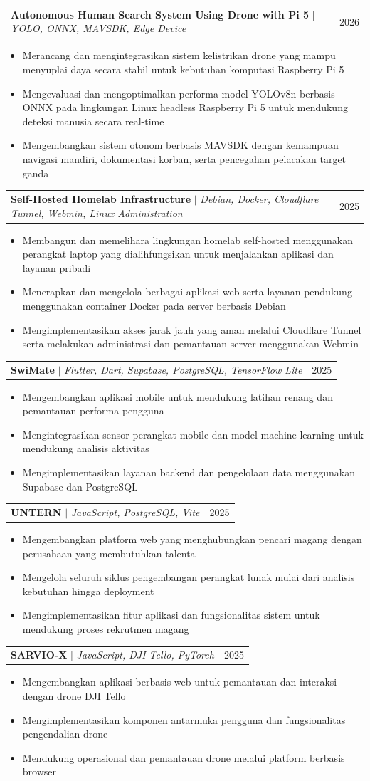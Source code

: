 \documentclass[letterpaper,11pt]{article}
\makeatletter
\newcommand{\resumeItem}[1]{
	\item\small{
		{#1 \vspace{-2pt}}
	}
}
\newcommand{\resumeProjectHeading}[2]{
	\item
	\begin{tabular*}{0.97\textwidth}{l@{\extracolsep{\fill}}r}
		\small#1 & #2 \\
	\end{tabular*}\vspace{-7pt}
}
\newcommand{\resumeItemListStart}{\begin{itemize}}
\newcommand{\resumeItemListEnd}{\end{itemize}\vspace{-5pt}}
\makeatother
\begin{document}
	\resumeProjectHeading
	{\textbf{Autonomous Human Search System Using Drone with Pi 5} $|$ \emph{YOLO, ONNX, MAVSDK, Edge Device}}{2026}
	\resumeItemListStart
	\resumeItem{Merancang dan mengintegrasikan sistem kelistrikan drone yang mampu menyuplai daya secara stabil untuk kebutuhan komputasi Raspberry Pi 5}
	\resumeItem{Mengevaluasi dan mengoptimalkan performa model YOLOv8n berbasis ONNX pada lingkungan Linux headless Raspberry Pi 5 untuk mendukung deteksi manusia secara real-time}
	\resumeItem{Mengembangkan sistem otonom berbasis MAVSDK dengan kemampuan navigasi mandiri, dokumentasi korban, serta pencegahan pelacakan target ganda}
	\resumeItemListEnd
	
	\resumeProjectHeading
	{\textbf{Self-Hosted Homelab Infrastructure} $|$ \emph{Debian, Docker, Cloudflare Tunnel, Webmin, Linux Administration}}{2025}
	\resumeItemListStart
	\resumeItem{Membangun dan memelihara lingkungan homelab self-hosted menggunakan perangkat laptop yang dialihfungsikan untuk menjalankan aplikasi dan layanan pribadi}
	\resumeItem{Menerapkan dan mengelola berbagai aplikasi web serta layanan pendukung menggunakan container Docker pada server berbasis Debian}
	\resumeItem{Mengimplementasikan akses jarak jauh yang aman melalui Cloudflare Tunnel serta melakukan administrasi dan pemantauan server menggunakan Webmin}
	\resumeItemListEnd
	
	\resumeProjectHeading
	{\textbf{SwiMate} $|$ \emph{Flutter, Dart, Supabase, PostgreSQL, TensorFlow Lite}}{2025}
	\resumeItemListStart
	\resumeItem{Mengembangkan aplikasi mobile untuk mendukung latihan renang dan pemantauan performa pengguna}
	\resumeItem{Mengintegrasikan sensor perangkat mobile dan model machine learning untuk mendukung analisis aktivitas}
	\resumeItem{Mengimplementasikan layanan backend dan pengelolaan data menggunakan Supabase dan PostgreSQL}
	\resumeItemListEnd
	
	\resumeProjectHeading
	{\textbf{UNTERN} $|$ \emph{JavaScript, PostgreSQL, Vite}}{2025}
	\resumeItemListStart
	\resumeItem{Mengembangkan platform web yang menghubungkan pencari magang dengan perusahaan yang membutuhkan talenta}
	\resumeItem{Mengelola seluruh siklus pengembangan perangkat lunak mulai dari analisis kebutuhan hingga deployment}
	\resumeItem{Mengimplementasikan fitur aplikasi dan fungsionalitas sistem untuk mendukung proses rekrutmen magang}
	\resumeItemListEnd
	
	\resumeProjectHeading
	{\textbf{SARVIO-X} $|$ \emph{JavaScript, DJI Tello, PyTorch}}{2025}
	\resumeItemListStart
	\resumeItem{Mengembangkan aplikasi berbasis web untuk pemantauan dan interaksi dengan drone DJI Tello}
	\resumeItem{Mengimplementasikan komponen antarmuka pengguna dan fungsionalitas pengendalian drone}
	\resumeItem{Mendukung operasional dan pemantauan drone melalui platform berbasis browser}
	\resumeItemListEnd
	
\end{document}
